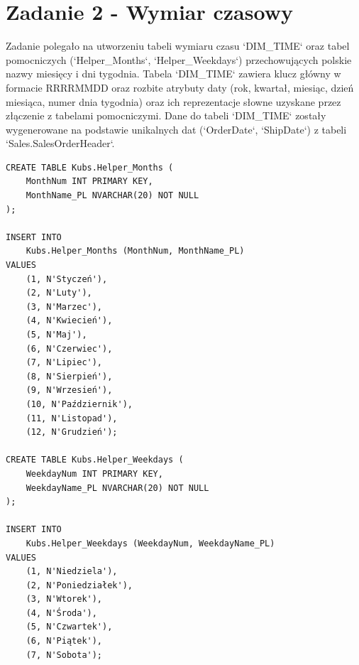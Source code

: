 \documentclass[a4paper,12pt]{article}
\begin{document}
\section{Zadanie 2 - Wymiar czasowy}

Zadanie polegało na utworzeniu tabeli wymiaru czasu `DIM\_TIME` oraz tabel pomocniczych (`Helper\_Months`, `Helper\_Weekdays`) przechowujących polskie nazwy miesięcy i dni tygodnia. Tabela `DIM\_TIME` zawiera klucz główny w formacie RRRRMMDD oraz rozbite atrybuty daty (rok, kwartał, miesiąc, dzień miesiąca, numer dnia tygodnia) oraz ich reprezentacje słowne uzyskane przez złączenie z tabelami pomocniczymi. Dane do tabeli `DIM\_TIME` zostały wygenerowane na podstawie unikalnych dat (`OrderDate`, `ShipDate`) z tabeli `Sales.SalesOrderHeader`.

\begin{lstlisting}[caption={Tworzenie tabel pomocniczych dla wymiaru czasu.}, label=lst:zad2_helpers]
CREATE TABLE Kubs.Helper_Months (
    MonthNum INT PRIMARY KEY,
    MonthName_PL NVARCHAR(20) NOT NULL
);

INSERT INTO
    Kubs.Helper_Months (MonthNum, MonthName_PL)
VALUES
    (1, N'Styczeń'),
    (2, N'Luty'),
    (3, N'Marzec'),
    (4, N'Kwiecień'),
    (5, N'Maj'),
    (6, N'Czerwiec'),
    (7, N'Lipiec'),
    (8, N'Sierpień'),
    (9, N'Wrzesień'),
    (10, N'Październik'),
    (11, N'Listopad'),
    (12, N'Grudzień');

CREATE TABLE Kubs.Helper_Weekdays (
    WeekdayNum INT PRIMARY KEY,
    WeekdayName_PL NVARCHAR(20) NOT NULL
);

INSERT INTO
    Kubs.Helper_Weekdays (WeekdayNum, WeekdayName_PL)
VALUES
    (1, N'Niedziela'),
    (2, N'Poniedziałek'),
    (3, N'Wtorek'),
    (4, N'Środa'),
    (5, N'Czwartek'),
    (6, N'Piątek'),
    (7, N'Sobota');
\end{lstlisting}
\end{document}

